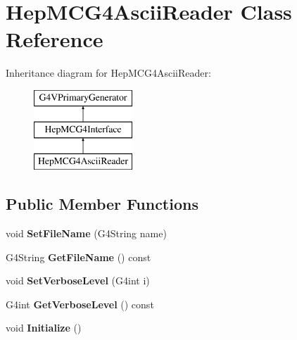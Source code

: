 \hypertarget{class_hep_m_c_g4_ascii_reader}{}\section{Hep\+M\+C\+G4\+Ascii\+Reader Class Reference}
\label{class_hep_m_c_g4_ascii_reader}
Inheritance diagram for Hep\+M\+C\+G4\+Ascii\+Reader\+:\begin{figure}[H]
\begin{center}
\leavevmode
\includegraphics[height=3.000000cm]{class_hep_m_c_g4_ascii_reader}
\end{center}
\end{figure}
\subsection*{Public Member Functions}
\begin{DoxyCompactItemize}
\item 
\hypertarget{class_hep_m_c_g4_ascii_reader_a5063529b9bb4b313ee06e22586a65307}{}void {\bfseries Set\+File\+Name} (G4\+String name)\label{class_hep_m_c_g4_ascii_reader_a5063529b9bb4b313ee06e22586a65307}

\item 
\hypertarget{class_hep_m_c_g4_ascii_reader_a5a9220dfa44114171c1ed8f73e8877fc}{}G4\+String {\bfseries Get\+File\+Name} () const \label{class_hep_m_c_g4_ascii_reader_a5a9220dfa44114171c1ed8f73e8877fc}

\item 
\hypertarget{class_hep_m_c_g4_ascii_reader_a900843ac4f5da113a1ad788656747478}{}void {\bfseries Set\+Verbose\+Level} (G4int i)\label{class_hep_m_c_g4_ascii_reader_a900843ac4f5da113a1ad788656747478}

\item 
\hypertarget{class_hep_m_c_g4_ascii_reader_a71f59f07680ca33a5d532d47147a036a}{}G4int {\bfseries Get\+Verbose\+Level} () const \label{class_hep_m_c_g4_ascii_reader_a71f59f07680ca33a5d532d47147a036a}

\item 
\hypertarget{class_hep_m_c_g4_ascii_reader_adff7c9489d2d6958cdca4ed49fdaac68}{}void {\bfseries Initialize} ()\label{class_hep_m_c_g4_ascii_reader_adff7c9489d2d6958cdca4ed49fdaac68}

\end{DoxyCompactItemize}

